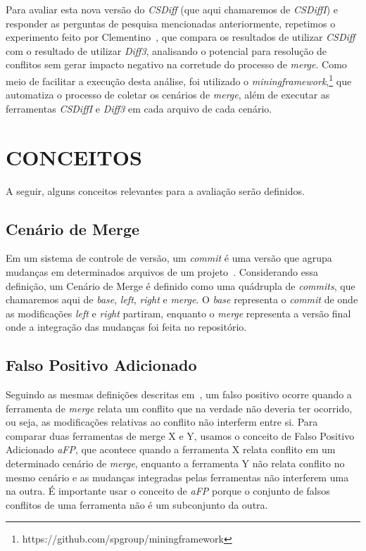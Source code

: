 Para avaliar esta nova versão do \emph{CSDiff} (que aqui chamaremos de
\emph{CSDiffI}) e responder as perguntas de pesquisa mencionadas anteriormente,
repetimos o experimento feito por Clementino~\cite{heitor21,clem21}, que
compara os resultados de utilizar \emph{CSDiff} com o resultado de utilizar
\emph{Diff3}, analisando o potencial para resolução de conflitos sem gerar
impacto negativo na corretude do processo de \emph{merge}. Como meio de
facilitar a execução desta análise, foi utilizado o
\emph{miningframework},\footnote{https://github.com/spgroup/miningframework}
que automatiza o processo de coletar os cenários de \emph{merge}, além de
executar as ferramentas \emph{CSDiffI} e \emph{Diff3} em cada arquivo de cada
cenário.

\section{CONCEITOS}\label{conceitos}
A seguir, alguns conceitos relevantes para a avaliação serão definidos.

\subsection{Cenário de Merge}
Em um sistema de controle de versão, um \emph{commit} é uma versão que agrupa
mudanças em determinados arquivos de um projeto~\cite{koc11}. Considerando essa
definição, um Cenário de Merge é definido como uma quádrupla de \emph{commits},
que chamaremos aqui de \emph{base}, \emph{left}, \emph{right} e \emph{merge}. O
\emph{base} representa o \emph{commit} de onde as modificações \emph{left} e
\emph{right} partiram, enquanto o \emph{merge} representa a versão final onde a
integração das mudanças foi feita no repositório.

\subsection{Falso Positivo Adicionado}
Seguindo as mesmas definições descritas em~\cite{clem21}, um falso positivo
ocorre quando a ferramenta de \emph{merge} relata um conflito que na verdade
não deveria ter ocorrido, ou seja, as modificações relativas ao conflito não
interferm entre si. Para comparar duas ferramentas de merge X e Y, usamos o
conceito de Falso Positivo Adicionado \emph{aFP}, que acontece quando a
ferramenta X relata conflito em um determinado cenário de \emph{merge},
enquanto a ferramenta Y não relata conflito no mesmo cenário e as mudanças
integradas pelas ferramentas não interferem uma na outra. É importante usar o
conceito de \emph{aFP} porque o conjunto de falsos conflitos de uma ferramenta
não é um subconjunto da outra.

